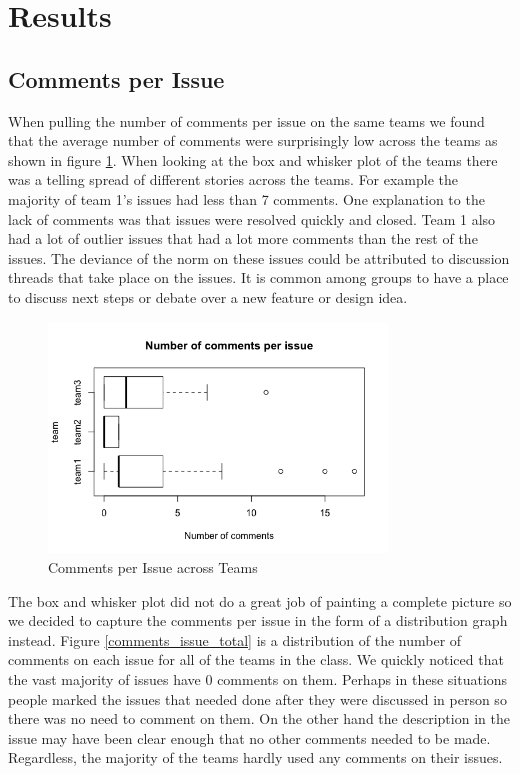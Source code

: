 \documentclass[conference]{IEEEtran}
\begin{document}
\section{Results}
\subsection{Comments per Issue}
When pulling the number of comments per issue on the same teams we found that the average number of comments were surprisingly low across the teams as shown in figure \ref{comments_issue}. When looking at the box and whisker plot of the teams there was a telling spread of different stories across the teams. For example the majority of team 1's issues had less than 7 comments. One explanation to the lack of comments was that issues were resolved quickly and closed. Team 1 also had a lot of outlier issues that had a lot more comments than the rest of the issues. The deviance of the norm on these issues could be attributed to discussion threads that take place on the issues. It is common among groups to have a place to discuss next steps or debate over a new feature or design idea.

\begin{figure}[H]
    \centering
    \includegraphics[width=9cm]{../AprilProject/pic/comments_per_issue.png}
    \caption{Comments per Issue across Teams}
    \label{comments_issue}
\end{figure}

The box and whisker plot did not do a great job of painting a complete picture so we decided to capture the comments per issue in the form of a distribution graph instead. Figure \ref{comments_issue_total} is a distribution of the number of comments on each issue for all of the teams in the class. We quickly noticed that the vast majority of issues have 0 comments on them. Perhaps in these situations people marked the issues that needed done after they were discussed in person so there was no need to comment on them. On the other hand the description in the issue may have been clear enough that no other comments needed to be made. Regardless, the majority of the teams hardly used any comments on their issues. 
\end{document}
